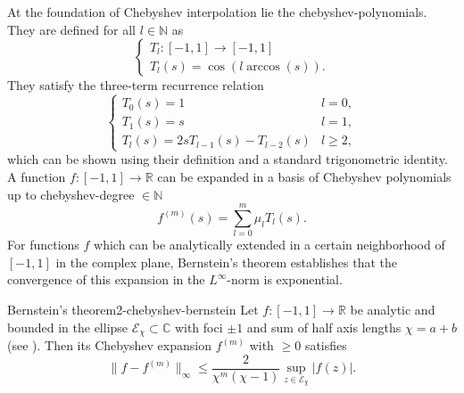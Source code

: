At the foundation of Chebyshev interpolation lie the \glspl{chebyshev-polynomial}.
They are defined for all $l \in \mathbb{N}$ as \cite[chapter~3]{trefethen2019chebyshev}
\begin{equation}
    \begin{cases}
        T_l: [-1, 1] \to [-1, 1] \\
        T_l(s) = \cos(l \arccos(s)).
    \end{cases}
    \label{equ:2-chebyshev-chebyshev-definition}
\end{equation}
They satisfy the three-term recurrence relation
\begin{equation}
    \begin{cases}
        T_0(s) = 1 & l = 0, \\
        T_1(s) = s & l = 1, \\
        T_{l}(s) = 2s T_{l-1}(s) - T_{l-2}(s) & l \geq 2,
    \end{cases}
    \label{equ:2-chebyshev-chebyshev-recursion}
\end{equation}
which can be shown using their definition 
and a standard trigonometric identity.\\

A function $f:[-1, 1] \to \mathbb{R}$ can be expanded in a basis of Chebyshev
polynomials up to \gls{chebyshev-degree} $\in \mathbb{N}$ \cite[chapter~3]{trefethen2019chebyshev}
\begin{equation}
    f^{(m)}(s) = \sum_{l=0}^{m} \mu_l T_l(s).
    \label{equ:2-chebyshev-chebyshev-expansion-general}
\end{equation}
For functions $f$ which can be analytically extended in a certain neighborhood
of $[-1, 1]$ in the complex plane, Bernstein's theorem \cite[theorem~4.3]{trefethen2008gauss}
establishes that the convergence of this expansion in the $L^{\infty}$-norm is
exponential.
\begin{theorem}{Bernstein's theorem}{2-chebyshev-bernstein}
    Let $f:[-1, 1] \to \mathbb{R}$ be analytic and bounded in the ellipse $\mathcal{E}_{\chi} \subset \mathbb{C}$
    with foci $\pm 1$ and sum of half axis lengths $\chi = a + b$ (see ).
    Then its Chebyshev expansion $f^{(m)}$ with  $\geq 0$ satisfies
    \begin{equation}
        \lVert f - f^{(m)} \rVert _{\infty} \leq \frac{2}{\chi^{m}(\chi-1)} \sup_{z \in \mathcal{E}_{\chi}} |f(z)|.
        \label{equ:2-chebyshev-bernstein-convergence-result}
    \end{equation}
\end{theorem}


